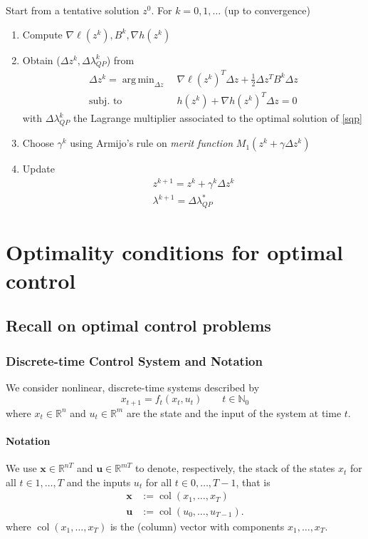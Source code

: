 \documentclass[openany]{book}
\DeclareMathOperator{\col}{col}           %
\DeclareMathOperator*{\argmin}{arg\,min}  %
\newcommand{\R}{\mathbb{R}}               %
\newcommand{\N}{\mathbb{N}}               %
\theoremstyle{definition}
\theoremstyle{remark}
\begin{document}
Start from a tentative solution $z^0$. For $k=0,1,\dots$ (up to convergence)
\begin{enumerate}
    \item Compute $\nabla\ell(z^k),B^k,\nabla h(z^k)$ 
    \item Obtain ($\Delta z^k, \Delta \lambda^k_{QP}$) from 
        \begin{align}\label{sqp}
                \Delta z^k = \argmin_{\Delta z}\  & \nabla \ell(z^k)^T\Delta z +\displaystyle\frac{1}{2}\Delta z^T B^k \Delta z \\
                \text{subj. to }\  & h(z^k) + \nabla h(z^k)^T \Delta z = 0
        \end{align}
        with $\Delta\lambda^k_{QP}$ the Lagrange multiplier associated to the optimal solution of \eqref{sqp}
    \item Choose $\gamma^k$ using Armijo's rule on \emph{merit function} $M_1(z^k+\gamma\Delta z^k)$
    \item Update 
        \begin{gather*}
            z^{k+1} = z^k+ \gamma^k\Delta z^k \\
            \lambda^{k+1} = \Delta \lambda^*_{QP}
        \end{gather*}
\end{enumerate}


\chapter{Optimality conditions for optimal control}
\section{Recall on optimal control problems}
\subsection{Discrete-time Control System and Notation}

We consider nonlinear, discrete-time systems described by
\begin{equation}
    x_{t+1} = f_t(x_t, u_t) \qquad t \in \N_0
\end{equation}
where $x_t \in \R^n$ and $u_t \in \R^m$ are the state and the input of the system at time $t$.

\subsubsection*{Notation}
We use $\mathbf{x} \in \R^{nT}$ and $\mathbf{u} \in \R^{mT}$ to denote, respectively, the stack of the states $x_t$ for all $t \in 1,\ldots,T$ and the inputs $u_t$ for all $t \in 0,\ldots,T-1$, that is
\begin{align*}
    \mathbf{x} &:= \col(x_1,\ldots,x_T) \\
    \mathbf{u} &:= \col(u_0,\ldots,u_{T-1}).
\end{align*}
where $\col(x_1,\ldots,x_T)$ is the (column) vector with components $x_1,\ldots,x_T$.
\end{document}
